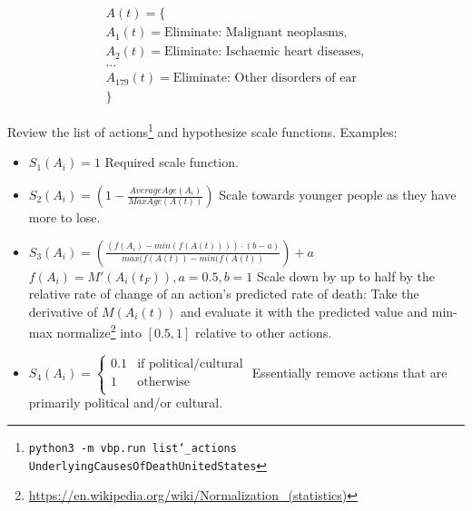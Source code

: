 \documentclass[12pt, a4paper, twocolumn]{article}
\begin{document}
\begin{equation*}
  \begin{gathered}
    A(t) = \{\\
    A_1(t) = \textrm{Eliminate: Malignant neoplasms},\\
    A_2(t) = \textrm{Eliminate: Ischaemic heart diseases},\\
    \textrm{\ldots}\\
    A_{179}(t) = \textrm{Eliminate: Other disorders of ear}\\
    \}
  \end{gathered}
\end{equation*}

Review the list of actions\footnote{\texttt{python3 -m vbp.run list\char`_actions UnderlyingCausesOfDeathUnitedStates}} and hypothesize scale functions. Examples:

\begin{itemize}
  \item $S_1(A_i) = 1$
                  \newline\newline
                  Required scale function.
  \item $S_2(A_i) = \left(1 - \frac{AverageAge(A_i)}{MaxAge(A(t))}\right)$
                  \newline\newline
                  Scale towards younger people as they have more to lose.
  \item $S_3(A_i) = \left(\frac{(f(A_i)-min(f(A(t)))) \cdot (b-a)}{max(f(A(t))-min(f(A(t))}\right) + a$
                  \newline\newline
                  $f(A_i) = M'(A_i(t_F)), a=0.5, b=1$
                  \newline\newline
                  Scale down by up to half by the relative rate of change of an action's predicted rate of death: Take the derivative of $M(A_i(t))$ and evaluate it with the predicted value and min-max normalize\footnote{\url{https://en.wikipedia.org/wiki/Normalization_(statistics)}} into $[0.5,1]$ relative to other actions.
  \item $S_4(A_i) = \begin{cases}\text{0.1} & \mbox{if political/cultural} \\ \text{1} & \mbox{otherwise} \\ \end{cases}$
                  \newline\newline
                  Essentially remove actions that are primarily political and/or cultural.
\end{itemize}
\end{document}
